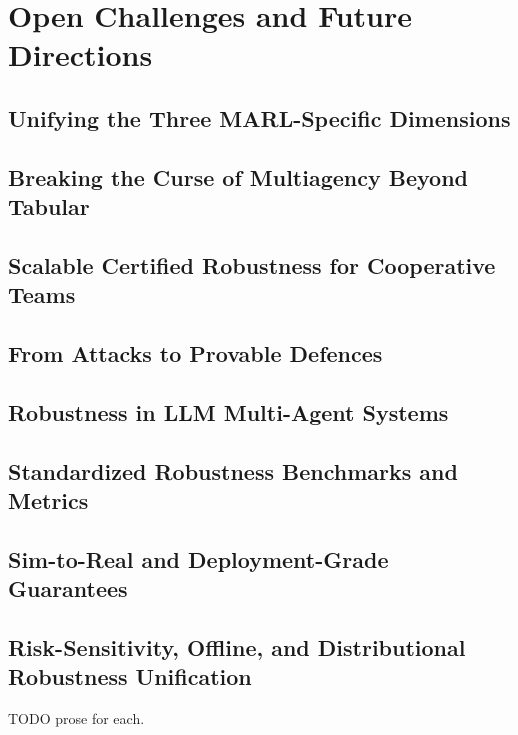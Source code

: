 \section{Open Challenges and Future Directions}
\label{sec:challenges}

\subsection{Unifying the Three MARL-Specific Dimensions}
\subsection{Breaking the Curse of Multiagency Beyond Tabular}
\subsection{Scalable Certified Robustness for Cooperative Teams}
\subsection{From Attacks to Provable Defences}
\subsection{Robustness in LLM Multi-Agent Systems}
\subsection{Standardized Robustness Benchmarks and Metrics}
\subsection{Sim-to-Real and Deployment-Grade Guarantees}
\subsection{Risk-Sensitivity, Offline, and Distributional Robustness Unification}
TODO prose for each.
